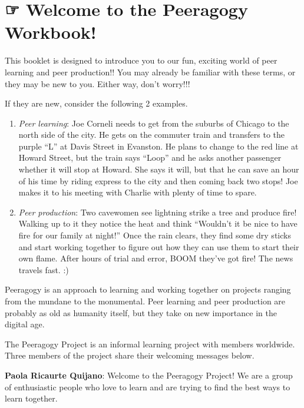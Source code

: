 \hypertarget{welcome-to-the-peeragogy-workbook}{%
\section{☞ Welcome to the Peeragogy
Workbook!}\label{welcome-to-the-peeragogy-workbook}}

This booklet is designed to introduce you to our fun, exciting world of
peer learning and peer production!! You may already be familiar with
these terms, or they may be new to you. Either way, don't worry!!!

If they are new, consider the following 2 examples.

\begin{enumerate}
\def\labelenumi{\arabic{enumi}.}
\item
  \emph{Peer learning}: Joe Corneli needs to get from the suburbs of
  Chicago to the north side of the city. He gets on the commuter train
  and transfers to the purple ``L'' at Davis Street in Evanston. He
  plans to change to the red line at Howard Street, but the train says
  ``Loop'' and he asks another passenger whether it will stop at Howard.
  She says it will, but that he can save an hour of his time by riding
  express to the city and then coming back two stops! Joe makes it to
  his meeting with Charlie with plenty of time to spare.
\item
  \emph{Peer production}: Two cavewomen see lightning strike a tree and
  produce fire! Walking up to it they notice the heat and think
  ``Wouldn't it be nice to have fire for our family at night!'' Once the
  rain clears, they find some dry sticks and start working together to
  figure out how they can use them to start their own flame. After hours
  of trial and error, BOOM they've got fire! The news travels fast. :)
\end{enumerate}

Peeragogy is an approach to learning and working together on projects
ranging from the mundane to the monumental. Peer learning and peer
production are probably as old as humanity itself, but they take on new
importance in the digital age.

The Peeragogy Project is an informal learning project with members
worldwide. Three members of the project share their welcoming messages
below.

\textbf{Paola Ricaurte Quijano}: Welcome to the Peeragogy Project! We
are a group of enthusiastic people who love to learn and are trying to
find the best ways to learn together.

